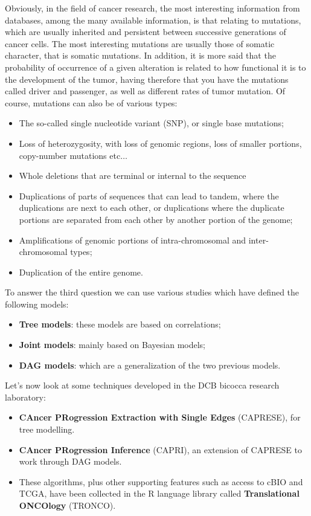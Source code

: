 Obviously, in the field of cancer research, the most interesting information from databases, among 
the many available information, is that relating to mutations, which are usually inherited and 
persistent between successive generations of cancer cells. The most interesting mutations are usually 
those of somatic character, that is somatic mutations. In addition, it is more said that the probability
of occurrence of a given alteration is related to how functional it is to the development of the tumor,
having therefore that you have the mutations called driver and passenger, as well as different rates of 
tumor mutation. Of course, mutations can also be of various types:
\begin{itemize}
    \item The so-called single nucleotide variant (SNP), or single base mutations;
    \item Loss of heterozygosity, with loss of genomic regions, loss of smaller portions, 
        copy-number mutations etc$\dots$
    \item Whole deletions that are terminal or internal to the sequence
    \item Duplications of parts of sequences that can lead to tandem, where the duplications are next 
        to each other, or duplications where the duplicate portions are separated from each other by 
        another portion of the genome;
    \item Amplifications of genomic portions of intra-chromosomal and inter-chromosomal types; 
    \item Duplication of the entire genome.
\end{itemize}

To answer the third question we can use various studies which have defined the following models:
\begin{itemize}
    \item \textbf{Tree models}: these models are based on correlations;
    \item \textbf{Joint models}: mainly based on Bayesian models;
    \item \textbf{DAG models}: which are a generalization of the two previous models.
\end{itemize}

Let’s now look at some techniques developed in the DCB bicocca research laboratory:
\begin{itemize}
    \item \textbf{CAncer PRogression Extraction with Single Edges} (CAPRESE), for tree modelling.
    \item \textbf{CAncer PRogression Inference} (CAPRI), an extension of CAPRESE to work through 
        DAG models.
    \item These algorithms, plus other supporting features such as access to cBIO and TCGA, have 
        been collected in the R language library called \textbf{Translational ONCOlogy} (TRONCO).
\end{itemize}

